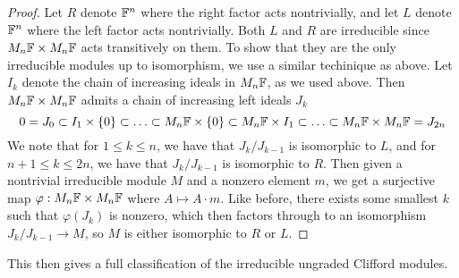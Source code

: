 \begin{proof}
Let $R$ denote $\mathbb{F}^n$ where the right factor acts nontrivially, and let $L$
denote $\mathbb{F}^n$ where the left factor acts nontrivially. Both $L$ and $R$ are
irreducible since $M_n\mathbb{F} \times M_n\mathbb{F}$ acts transitively on them. To show
that they are the only irreducible modules up to isomorphism, we use a similar
techinique as above. Let $I_k$ denote the chain of increasing ideals in $M_n\mathbb{F}$,
as we used above. Then $M_n\mathbb{F} \times M_n\mathbb{F}$ admits a chain of increasing left
ideals $J_k$
\[
0 = J_0 \subset I_1 \times \left\lbrace 0 \right\rbrace \subset \ldots \subset M_n\mathbb{F} \times \left\lbrace 0 \right\rbrace
\subset M_n\mathbb{F} \times I_1 \subset \ldots \subset M_n\mathbb{F} \times M_n\mathbb{F} = J_{2n}
\]
We note that for $1 \leq k \leq n$, we have that $J_k / J_{k-1}$ is isomorphic to
$L$, and for $n+1 \leq k \leq 2n$, we have that $J_k / J_{k-1}$ is isomorphic to
$R$. Then given a nontrivial irreducible module $M$ and a nonzero element $m$,
we get a surjective map $\varphi : M_n\mathbb{F} \times M_n\mathbb{F}$ where $A \mapsto A\cdot m$.
Like before, there exists some smallest $k$ such that $\varphi(J_k)$ is nonzero,
which then factors through to an isomorphism $J_k / J_{k-1} \to M$, so $M$
is either isomorphic to $R$ or $L$.
\end{proof}
%
This then gives a full classification of the irreducible ungraded Clifford
modules.
%
